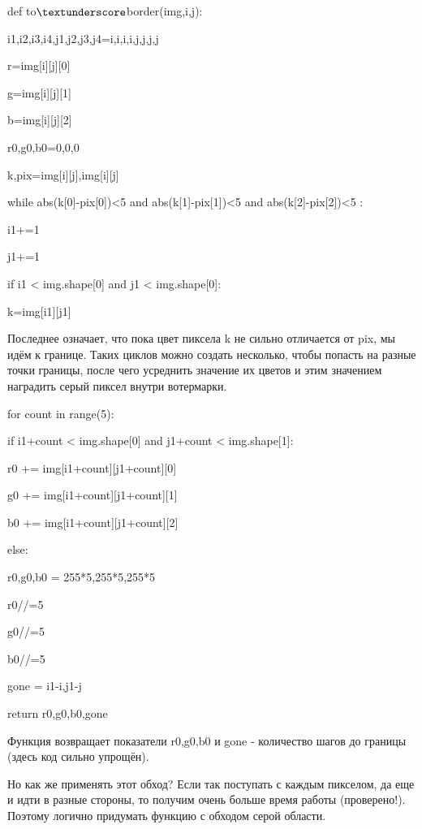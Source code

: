 \documentclass{article}
\newcommand\tab[1][1cm]{\hspace*{#1}}
\begin{document}
{
def to$\textunderscore $border(img,i,j):

\tab[1cm]    i1,i2,i3,i4,j1,j2,j3,j4=i,i,i,i,j,j,j,j

\tab[1cm]    r=img[i][j][0]

\tab[1cm]    g=img[i][j][1]

\tab[1cm]    b=img[i][j][2]

\tab[1cm]    r0,g0,b0=0,0,0

\tab[1cm]    k,pix=img[i][j],img[i][j]

\tab[1cm]    while abs(k[0]-pix[0])<5 and abs(k[1]-pix[1])<5 and abs(k[2]-pix[2])<5 :

\tab[2cm]       i1+=1

\tab[2cm]        j1+=1

\tab[1cm]        if i1 < img.shape[0] and j1 < img.shape[0]:

\tab[2cm]            k=img[i1][j1]
  }            
  
 Последнее означает, что пока цвет пиксела k не сильно отличается от pix, мы идём к границе. 
 Таких циклов можно создать несколько, чтобы попасть на разные точки границы, после чего усреднить значение их цветов и этим значением наградить серый пиксел внутри вотермарки.
 
 {
 for count in range(5):

\tab[1cm]        if i1+count < img.shape[0] and j1+count < img.shape[1]:

\tab[2cm]            r0 += img[i1+count][j1+count][0] 

\tab[2cm]            g0 += img[i1+count][j1+count][1]

\tab[2cm]            b0 += img[i1+count][j1+count][2]

\tab[1cm]        else:

\tab[2cm]           r0,g0,b0 = 255*5,255*5,255*5

\tab[1cm]    r0//=5

\tab[1cm]    g0//=5

\tab[1cm]    b0//=5

\tab[1cm]    gone = i1-i,j1-j

\tab[1cm]    return r0,g0,b0,gone}
  
  Функция возвращает показатели r0,g0,b0 и gone - количество шагов до границы (здесь код сильно упрощён).
  
  Но как же применять этот обход? Если так поступать с каждым пикселом, да еще и идти в разные стороны, то получим очень больше время работы (проверено!). Поэтому логично придумать функцию с обходом серой области.
  
\end{document}
